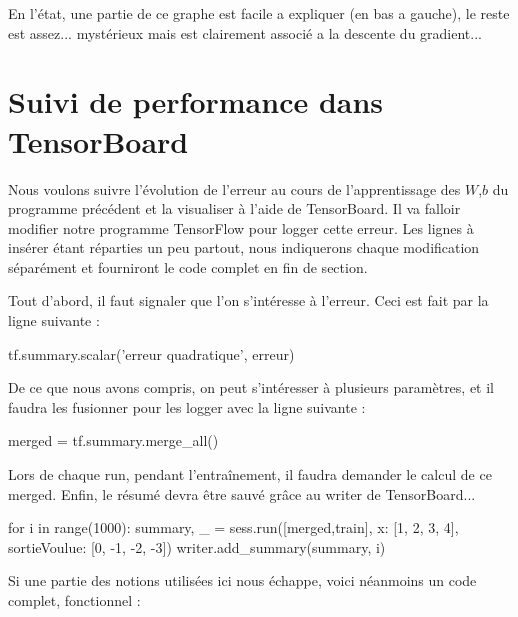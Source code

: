 \documentclass[a4paper,11pt]{book}
\theoremstyle{theo}
\begin{document}
En l'état, une partie de ce graphe est facile a expliquer (en bas a gauche), le reste est assez... mystérieux mais est clairement associé a la descente du gradient...

\section{Suivi de performance dans TensorBoard}
Nous voulons suivre l’évolution de l'erreur au cours de l'apprentissage des $W$,$b$ du programme précédent et la visualiser à l'aide de TensorBoard.
Il va falloir modifier notre programme TensorFlow pour logger cette erreur. Les lignes à insérer étant réparties un peu partout, nous indiquerons chaque modification séparément et fourniront le code complet en fin de section.

Tout d'abord, il faut signaler que l'on s'intéresse à l'erreur. Ceci est fait par la ligne suivante :
\begin{mypython}
tf.summary.scalar('erreur quadratique', erreur)
\end{mypython}
De ce que nous avons compris, on peut s’intéresser à plusieurs paramètres, et il faudra les fusionner pour les logger avec la ligne suivante :
\begin{mypython}
merged = tf.summary.merge_all()
\end{mypython}
Lors de chaque run, pendant l’entraînement, il faudra demander le calcul de ce merged. Enfin, le résumé devra être sauvé grâce au writer de TensorBoard... 
\begin{mypython}
for i in range(1000):
  summary, _ = sess.run([merged,train], {x: [1, 2, 3, 4], sortieVoulue: [0, -1, -2, -3]})
  writer.add_summary(summary, i)
\end{mypython}
Si une partie des notions utilisées ici nous échappe, voici néanmoins un code complet, fonctionnel :
\end{document}
